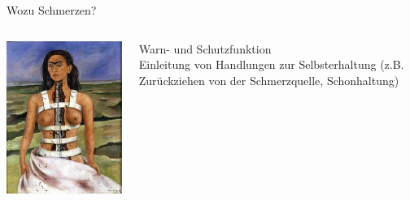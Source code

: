 \documentclass{beamer}
\begin{document}
\begin{frame}{Wozu Schmerzen?}


\begin{columns}[c]
\begin{column}{5cm}

\begin{center}
    \includegraphics[width=\textwidth]{The_Broken_Column.jpg}
\end{center}

\end{column}



\begin{column}{5cm}

Warn- und Schutzfunktion \\

Einleitung von Handlungen zur Selbsterhaltung (z.B. Zurückziehen von der Schmerzquelle, Schonhaltung)

\end{column}

\end{columns}
    
\end{frame}
\end{document}
